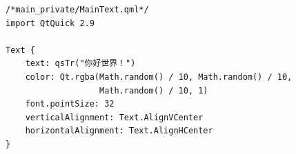 \begin{lstlisting}[label=f000033,
caption=GoodLuck,
title=\lstlistingname\ \thelstlisting
]
/*main_private/MainText.qml*/
import QtQuick 2.9

Text {
    text: qsTr("你好世界！")
    color: Qt.rgba(Math.random() / 10, Math.random() / 10,
                   Math.random() / 10, 1)
    font.pointSize: 32
    verticalAlignment: Text.AlignVCenter
    horizontalAlignment: Text.AlignHCenter
}
\end{lstlisting}          %










